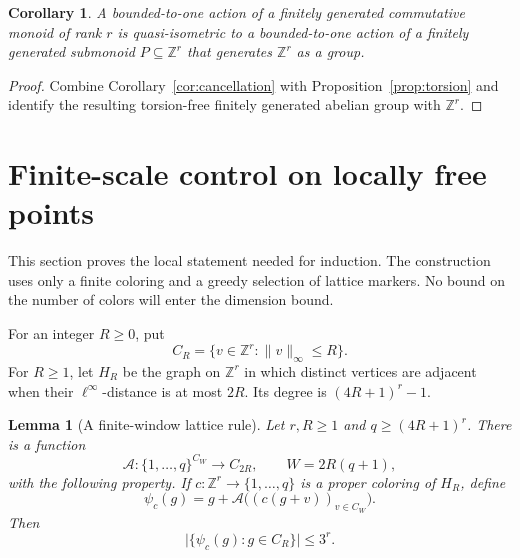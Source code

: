 \documentclass[10pt,a4paper]{amsart}
\newtheorem{lemma}[theorem]{Lemma}
\newtheorem{corollary}[theorem]{Corollary}
\newcommand{\ZZ}{\mathbb Z}
\newcommand{\norm}[1]{\lVert #1\rVert_\infty}
\begin{document}
\begin{corollary}\label{cor:lattice-reduction}
A bounded-to-one action of a finitely generated commutative monoid of
rank $r$ is quasi-isometric to a bounded-to-one action of a finitely
generated submonoid $P\subseteq\ZZ^r$ that generates $\ZZ^r$ as a group.
\end{corollary}

\begin{proof}
Combine Corollary~\ref{cor:cancellation} with
Proposition~\ref{prop:torsion} and identify the resulting torsion-free
finitely generated abelian group with $\ZZ^r$.
\end{proof}

\section{Finite-scale control on locally free points}\label{sec:local}

This section proves the local statement needed for induction. The
construction uses only a finite coloring and a greedy selection of lattice
markers. No bound on the number of colors will enter the dimension bound.

For an integer $R\ge0$, put
\[
 C_R=\{v\in\ZZ^r:\norm v\le R\}.
\]
For $R\ge1$, let $H_R$ be the graph on $\ZZ^r$ in which distinct vertices
are adjacent when their $\ell^\infty$-distance is at most $2R$. Its degree
is $(4R+1)^r-1$.

\begin{lemma}[A finite-window lattice rule]\label{lem:lattice-rule}
Let $r,R\ge1$ and $q\ge(4R+1)^r$. There is a function
\[
 \mathcal A:\{1,\ldots,q\}^{C_W}\longrightarrow C_{2R},
 \qquad W=2R(q+1),
\]
with the following property. If $c:\ZZ^r\to\{1,\ldots,q\}$ is a proper
coloring of $H_R$, define
\[
 \psi_c(g)=g+\mathcal A\bigl((c(g+v))_{v\in C_W}\bigr).
\]
Then
\begin{equation}\label{eq:lattice-count}
 \bigl|\{\psi_c(g):g\in C_R\}\bigr|\le3^r.
\end{equation}
\end{lemma}
\end{document}
